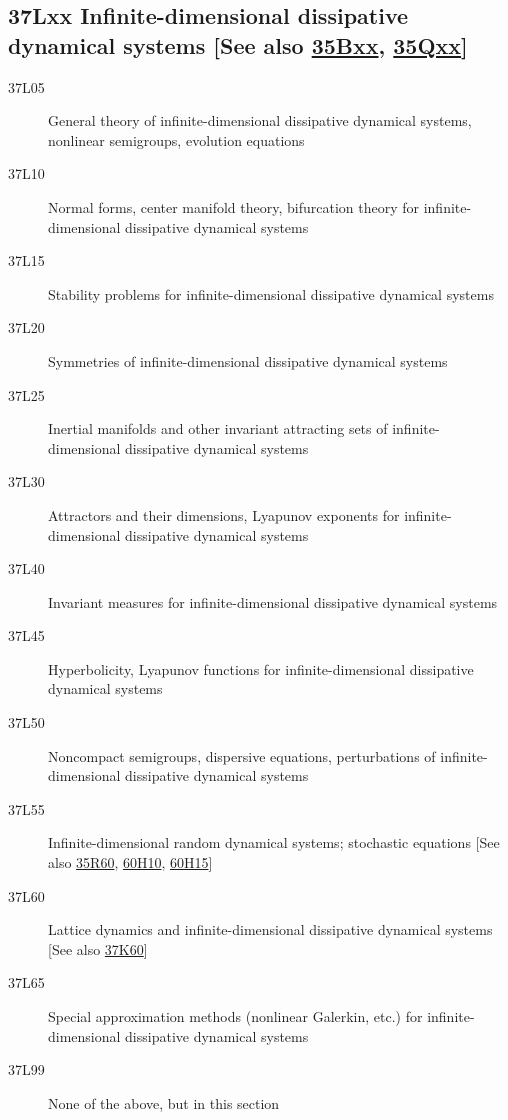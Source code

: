 \subsection*{37Lxx  Infinite-dimensional dissipative dynamical systems [See also \hyperref[35Bxx]{35Bxx}, \hyperref[35Qxx]{35Qxx}] }\label{37Lxx}
\begin{description} 
\item [37L05]\label{37L05} General theory of infinite-dimensional dissipative dynamical systems, nonlinear semigroups, evolution equations
\item [37L10]\label{37L10} Normal forms, center manifold theory, bifurcation theory for infinite-dimensional dissipative dynamical systems
\item [37L15]\label{37L15} Stability problems for infinite-dimensional dissipative dynamical systems
\item [37L20]\label{37L20} Symmetries of infinite-dimensional dissipative dynamical systems
\item [37L25]\label{37L25} Inertial manifolds and other invariant attracting sets of infinite-dimensional dissipative dynamical systems
\item [37L30]\label{37L30} Attractors and their dimensions, Lyapunov exponents for infinite-dimensional dissipative dynamical systems
\item [37L40]\label{37L40} Invariant measures for infinite-dimensional dissipative dynamical systems
\item [37L45]\label{37L45} Hyperbolicity, Lyapunov functions for infinite-dimensional dissipative dynamical systems
\item [37L50]\label{37L50} Noncompact semigroups, dispersive equations, perturbations of infinite-dimensional dissipative dynamical systems
\item [37L55]\label{37L55} Infinite-dimensional random dynamical systems; stochastic equations [See also \hyperref[35R60]{35R60}, \hyperref[60H10]{60H10}, \hyperref[60H15]{60H15}]
\item [37L60]\label{37L60} Lattice dynamics and infinite-dimensional dissipative dynamical systems [See also \hyperref[37K60]{37K60}]
\item [37L65]\label{37L65} Special approximation methods (nonlinear Galerkin, etc.) for infinite-dimensional dissipative dynamical systems
\item [37L99]\label{37L99} None of the above, but in this section
\end{description}
